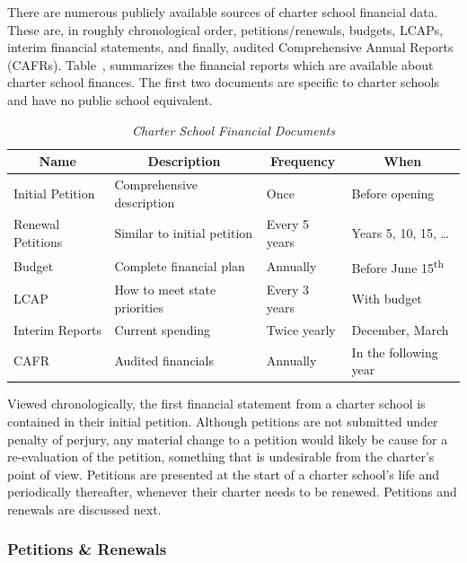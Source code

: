 There are numerous publicly available sources of charter school financial data. These are, in roughly chronological order, petitions/renewals, budgets, LCAPs,  interim financial statements, and finally, audited Comprehensive Annual Reports (CAFRs). Table~, summarizes the financial reports which are available about charter school finances. The first two documents are specific to charter schools and have no public school equivalent.

\begin{table}[h]
  \centering\small%
  \caption[Charter School Financial Documents]{\textit{Charter School Financial Documents}}\label{tab:charter-fin-docs}%
  \begin{tabular}{llll}
    \toprule%
    \multicolumn{1}{c}{Name}  & \multicolumn{1}{c}{Description} & \multicolumn{1}{c}{Frequency} & \multicolumn{1}{c}{When} \\
    \midrule%
    Initial Petition  & Comprehensive description    & Once           & Before opening \\
    Renewal Petitions &  Similar to initial petition & Every 5 years  & Years 5, 10, 15, \ldots \\
    Budget            & Complete financial plan      & Annually       & Before June 15\textsuperscript{th} \\
    LCAP              & How to meet state priorities & Every 3 years  & With budget\\
    Interim Reports   & Current spending             & Twice yearly   & December, March \\
    CAFR              & Audited financials           & Annually       & In the following year \\
    \bottomrule%
  \end{tabular}
\end{table}%

Viewed chronologically, the first financial statement from a charter school is contained in their initial petition. Although petitions are not submitted under penalty of perjury, any material change to a petition would likely be cause for a re-evaluation of the petition, something that is undesirable from the charter's point of view. Petitions are presented at the start of a charter school's life and periodically thereafter, whenever their charter needs to be renewed. Petitions and renewals are discussed next.

\subsubsection{Petitions \& Renewals}\label{sec:petitions-renewals}\indent

